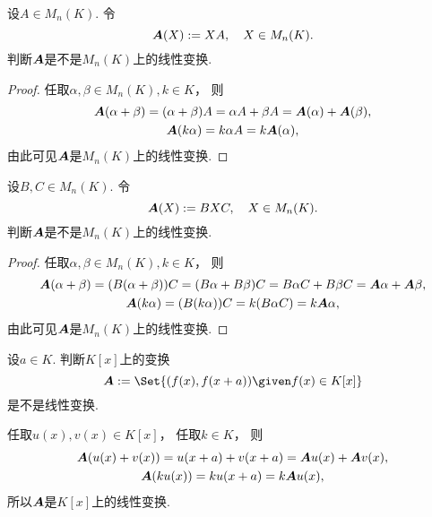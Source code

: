 \begin{example}
设\(A \in M_n(K)\).
令\[
	\boldsymbol{A}(X) := X A,
	\quad X \in M_n(K).
\]
判断\(\boldsymbol{A}\)是不是\(M_n(K)\)上的线性变换.
\begin{proof}
任取\(\alpha,\beta \in M_n(K),
k \in K\)，
则\begin{gather*}
	\boldsymbol{A}(\alpha + \beta)
	= (\alpha + \beta) A
	= \alpha A + \beta A
	= \boldsymbol{A}(\alpha) + \boldsymbol{A}(\beta), \\
	\boldsymbol{A}(k \alpha)
	= k \alpha A
	= k \boldsymbol{A}(\alpha),
\end{gather*}
由此可见\(\boldsymbol{A}\)是\(M_n(K)\)上的线性变换.
\end{proof}
\end{example}

\begin{example}
设\(B,C \in M_n(K)\).
令\[
	\boldsymbol{A}(X) := B X C,
	\quad X \in M_n(K).
\]
判断\(\boldsymbol{A}\)是不是\(M_n(K)\)上的线性变换.
\begin{proof}
任取\(\alpha,\beta \in M_n(K),
k \in K\)，
则\begin{gather*}
	\boldsymbol{A}(\alpha+\beta)
	= (B(\alpha+\beta))C
	= (B\alpha+B\beta)C
	= B \alpha C + B \beta C
	= \boldsymbol{A}\alpha + \boldsymbol{A}\beta, \\
	\boldsymbol{A}(k \alpha)
	= (B(k\alpha))C
	= k (B \alpha C)
	= k \boldsymbol{A}\alpha,
\end{gather*}
由此可见\(\boldsymbol{A}\)是\(M_n(K)\)上的线性变换.
\end{proof}
\end{example}

\begin{example}
设\(a \in K\).
判断\(K[x]\)上的变换\[
	\vb{A} \defeq \Set{
		(f(x),f(x+a))
		\given
		f(x) \in K[x]
	}
\]是不是线性变换.
\begin{solution}
任取\(u(x),v(x) \in K[x]\)，
任取\(k \in K\)，
则\begin{gather*}
	\boldsymbol{A}(u(x)+v(x))
	= u(x+a) + v(x+a)
	= \boldsymbol{A}u(x) + \boldsymbol{A}v(x), \\
	\boldsymbol{A}(k u(x))
	= k u(x+a)
	= k \boldsymbol{A}u(x),
\end{gather*}
所以\(\boldsymbol{A}\)是\(K[x]\)上的线性变换.
\end{solution}
\end{example}


